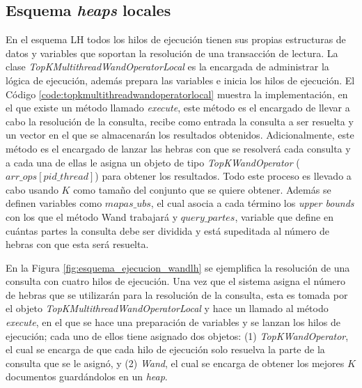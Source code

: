 \subsection{Esquema \textit{heaps} locales }
\label{evaluacionexperimental:esquemalh}
En el esquema LH todos los hilos de ejecución tienen sus propias estructuras de datos y variables que soportan la resolución de una transacción de lectura. La clase \textit{TopKMultithreadWandOperatorLocal} es la encargada de administrar la lógica de ejecución, además prepara las variables e inicia los hilos de ejecución. El Código \ref{code:topkmultithreadwandoperatorlocal} muestra la implementación, en el que existe un método llamado \textit{execute}, este método es el encargado de llevar a cabo la resolución de la consulta, recibe como entrada la consulta a ser resuelta y un vector en el que se almacenarán los resultados obtenidos. Adicionalmente, este método es el encargado de lanzar las hebras con que se resolverá cada consulta y a cada una de ellas le asigna un objeto de tipo \textit{TopKWandOperator} ($arr\_ops[pid\_thread]$) para obtener los resultados. Todo este proceso es llevado a cabo usando $K$ como tamaño del conjunto que se quiere obtener. Además se definen variables como \textit{$mapas\_ubs$}, el cual asocia a cada término los \textit{upper bounds} con los que el método Wand trabajará y \textit{$query\_partes$}, variable que define en cuántas partes la consulta debe ser dividida y está supeditada al número de hebras con que esta será resuelta.



En la Figura \ref{fig:esquema_ejecucion_wandlh} se ejemplifica la resolución de una consulta con cuatro hilos de ejecución. Una vez que el sistema asigna el número de hebras que se utilizarán para la resolución de la consulta, esta es tomada por el objeto \textit{TopKMultithreadWandOperatorLocal} y hace un llamado al método \textit{execute}, en el que se hace una preparación de variables y se lanzan los hilos de ejecución; cada uno de ellos tiene asignado dos objetos: (1) \textit{TopKWandOperator}, el cual se encarga de que cada hilo de ejecución solo resuelva la parte de la consulta que se le asignó, y (2) \textit{Wand}, el cual se encarga de obtener los mejores $K$ documentos guardándolos en un \textit{heap}.

